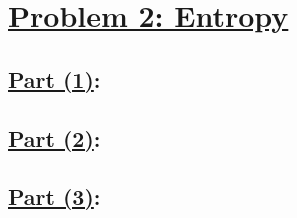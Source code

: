 \documentclass[12pt]{article}
\begin{document}
\section*{\underline{Problem 2: Entropy}}

\subsection*{\underline{Part (1)}:}

\subsection*{\underline{Part (2)}:}

\subsection*{\underline{Part (3)}:}
\end{document}

